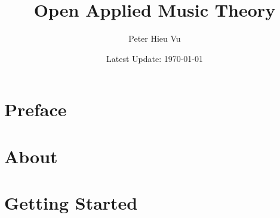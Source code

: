 \documentclass[12pt]{book}
\title{Open Applied Music Theory}
\author{Peter Hieu Vu}
\date{Latest Update: \today}
\newcommand\onlyinsubfile[1]{#1}
\newcommand\notinsubfile[1]{}
\begin{document}
    \renewcommand{\onlyinsubfile}[1]{}
    \renewcommand{\notinsubfile}[1]{#1}

    \maketitle

    \frontmatter
    \chapter{Preface}
        

    \chapter{About}
        

    \tableofcontents


    \mainmatter 
    \setcounter{chapter}{-1}
    
    \chapter{Getting Started}
        
    
\end{document}
